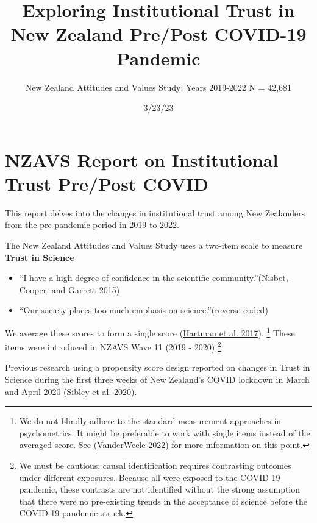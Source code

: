 \documentclass[
  singlecolumn]{report}
\title{Exploring Institutional Trust in New Zealand Pre/Post COVID-19
Pandemic}
\subtitle{New Zealand Attitudes and Values Study: Years 2019-2022 N =
42,681}
\author{}
\date{3/23/23}
\begin{document}
\maketitle
\ifdefined\Shaded\renewenvironment{Shaded}{\begin{tcolorbox}[boxrule=0pt, frame hidden, interior hidden, borderline west={3pt}{0pt}{shadecolor}, breakable, enhanced, sharp corners]}{\end{tcolorbox}}\fi

\listoffigures
\listoftables
\hypertarget{nzavs-report-on-institutional-trust-prepost-covid}{%
\section{NZAVS Report on Institutional Trust Pre/Post
COVID}\label{nzavs-report-on-institutional-trust-prepost-covid}}

This report delves into the changes in institutional trust among New
Zealanders from the pre-pandemic period in 2019 to 2022.

The New Zealand Attitudes and Values Study uses a two-item scale to
measure \textbf{Trust in Science}

\begin{itemize}
\item
  ``I have a high degree of confidence in the scientific
  community.''(\protect\hyperlink{ref-nisbet2015}{Nisbet, Cooper, and
  Garrett 2015})
\item
  ``Our society places too much emphasis on science.''(reverse coded)
\end{itemize}

We average these scores to form a single score
(\protect\hyperlink{ref-hartman2017}{Hartman et al. 2017}). \footnote{We
  do not blindly adhere to the standard measurement approaches in
  psychometrics. It might be preferable to work with single items
  instead of the averaged score. See
  (\protect\hyperlink{ref-vanderweele2022}{VanderWeele 2022}) for more
  information on this point.} These items were introduced in NZAVS Wave
11 (2019 - 2020) \footnote{We must be cautious: causal identification
  requires contrasting outcomes under different exposures. Because all
  were exposed to the COVID-19 pandemic, these contrasts are not
  identified without the strong assumption that there were no
  pre-existing trends in the acceptance of science before the COVID-19
  pandemic struck.}

Previous research using a propensity score design reported on changes in
Trust in Science during the first three weeks of New Zealand's COVID
lockdown in March and April 2020
(\protect\hyperlink{ref-sibley2020}{Sibley et al. 2020}).
\end{document}
